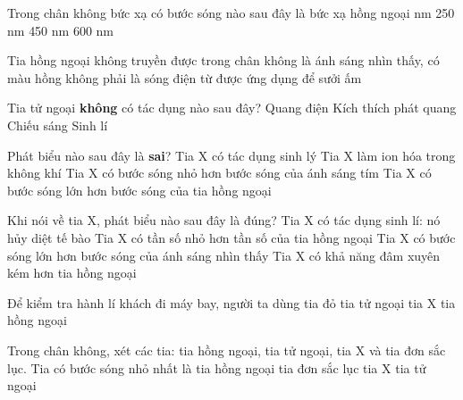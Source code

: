 \begin{ex} 
 Trong chân không bức xạ có bước sóng nào sau đây là bức xạ hồng ngoại
\choice
{ nm}
{250 nm}
{450 nm}
{600 nm}
\end{ex} 
\begin{ex}%
Tia hồng ngoại
\choice
{không truyền được trong chân không}
{là ánh sáng nhìn thấy, có màu hồng}
{không phải là sóng điện từ}
{\True được ứng dụng để sưởi ấm}
\end{ex} 
\begin{ex}%
Tia tử ngoại \textbf{không} có tác dụng nào sau đây?
\choice
{Quang điện}
{Kích thích phát quang}
{\True Chiếu sáng}
{Sinh lí}
\end{ex} 
\begin{ex} %
 Phát biểu nào sau đây là \textbf{sai}?
\choice
{Tia X có tác dụng sinh lý}
{Tia X làm ion hóa trong không khí}
{Tia X có bước sóng nhỏ hơn bước sóng của ánh sáng tím}
{\True Tia X có bước sóng lớn hơn bước sóng của tia hồng ngoại}
\end{ex} 
\begin{ex}%
 Khi nói về tia X, phát biểu nào sau đây là đúng?
\choice
{\True Tia X có tác dụng sinh lí: nó hủy diệt tế bào}
{Tia X có tần số nhỏ hơn tần số của tia hồng ngoại}
{Tia X có bước sóng lớn hơn bước sóng của ánh sáng nhìn thấy}
{Tia X có khả năng đâm xuyên kém hơn tia hồng ngoại}
\end{ex} 
\begin{ex}%
Để kiểm tra hành lí khách đi máy bay, người ta dùng 
\choice
{tia đỏ}
{tia tử ngoại}
{\True tia X}
{tia hồng ngoại}
\end{ex} 
\begin{ex}%
Trong chân không, xét các tia: tia hồng ngoại, tia tử ngoại, tia X và tia đơn sắc lục. Tia có bước sóng nhỏ nhất là
\choice
{tia hồng ngoại}
{tia đơn sắc lục}
{\True tia X}
{tia tử ngoại}
\end{ex} 
